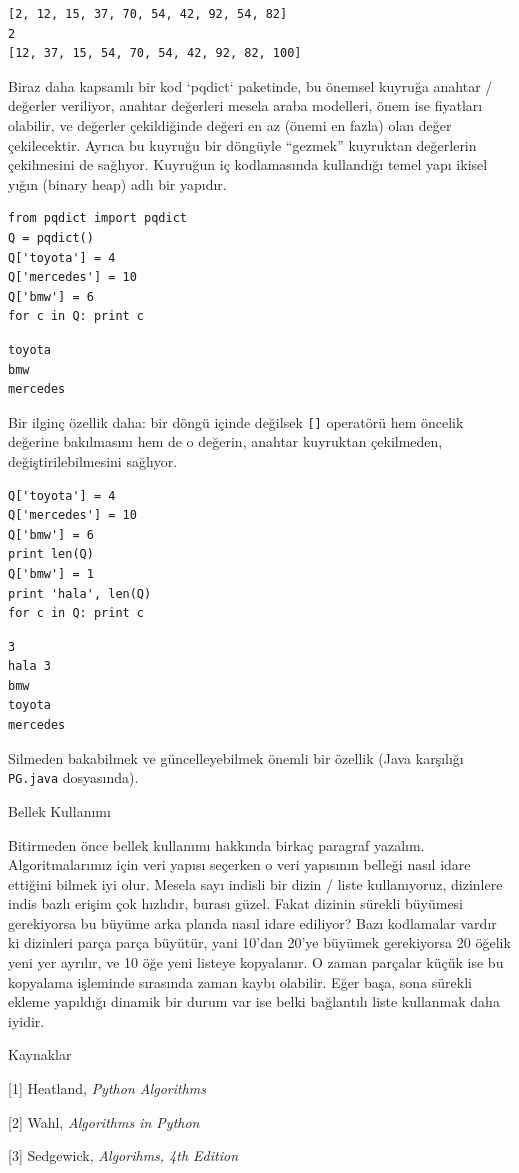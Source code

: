 \documentclass[12pt,fleqn]{article}\usepackage{../../common}
\begin{document}
\begin{verbatim}
[2, 12, 15, 37, 70, 54, 42, 92, 54, 82]
2
[12, 37, 15, 54, 70, 54, 42, 92, 82, 100]
\end{verbatim}

Biraz daha kapsamlı bir kod `pqdict` paketinde, bu önemsel kuyruğa anahtar /
değerler veriliyor, anahtar değerleri mesela araba modelleri, önem ise fiyatları
olabilir, ve değerler çekildiğinde değeri en az (önemi en fazla) olan değer
çekilecektir. Ayrıca bu kuyruğu bir döngüyle ``gezmek'' kuyruktan değerlerin
çekilmesini de sağlıyor. Kuyruğun iç kodlamasında kullandığı temel yapı ikisel
yığın (binary heap) adlı bir yapıdır.

\begin{verbatim}
from pqdict import pqdict
Q = pqdict() 
Q['toyota'] = 4
Q['mercedes'] = 10
Q['bmw'] = 6
for c in Q: print c
\end{verbatim}

\begin{verbatim}
toyota
bmw
mercedes
\end{verbatim}

Bir ilginç özellik daha: bir döngü içinde değilsek \verb![]!  operatörü hem
öncelik değerine bakılmasını hem de o değerin, anahtar kuyruktan
çekilmeden, değiştirilebilmesini sağlıyor.

\begin{verbatim}
Q['toyota'] = 4
Q['mercedes'] = 10
Q['bmw'] = 6
print len(Q)
Q['bmw'] = 1
print 'hala', len(Q)
for c in Q: print c
\end{verbatim}

\begin{verbatim}
3
hala 3
bmw
toyota
mercedes
\end{verbatim}

Silmeden bakabilmek ve güncelleyebilmek önemli bir özellik (Java karşılığı
\verb!PG.java! dosyasında).

Bellek Kullanımı

Bitirmeden önce bellek kullanımı hakkında birkaç paragraf
yazalım. Algoritmalarımız için veri yapısı seçerken o veri yapısının
belleği nasıl idare ettiğini bilmek iyi olur. Mesela sayı indisli bir dizin
/ liste kullanıyoruz, dizinlere indis bazlı erişim çok hızlıdır, burası
güzel. Fakat dizinin sürekli büyümesi gerekiyorsa bu büyüme arka planda
nasıl idare ediliyor? Bazı kodlamalar vardır ki dizinleri parça parça
büyütür, yani 10'dan 20'ye büyümek gerekiyorsa 20 öğelik yeni yer ayrılır,
ve 10 öğe yeni listeye kopyalanır. O zaman parçalar küçük ise bu kopyalama
işleminde sırasında zaman kaybı olabilir. Eğer başa, sona sürekli ekleme
yapıldığı dinamik bir durum var ise belki bağlantılı liste kullanmak daha
iyidir.


Kaynaklar

[1] Heatland, {\em Python Algorithms}

[2] Wahl, {\em Algorithms in Python}

[3] Sedgewick, {\em Algorihms, 4th Edition}
\end{document}
